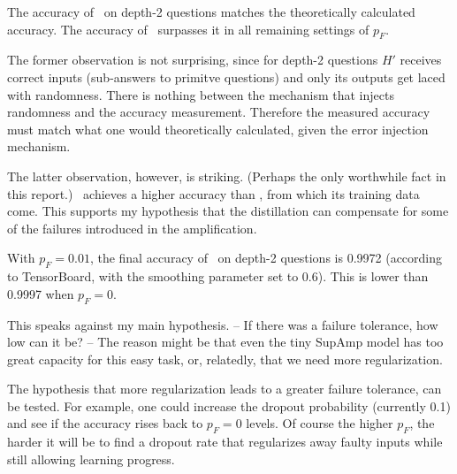 \documentclass{farlamp}
\begin{document}
\begin{LCRow}
\end{LCRow}

\Obs The accuracy of \AmpHp\ on depth-2 questions matches the theoretically
calculated accuracy. The accuracy of \Xpa\ surpasses it in all remaining settings
of $p_F$.

\Disc The former observation is not surprising, since for depth-2 questions $H'$
receives correct inputs (sub-answers to primitve questions) and only its outputs
get laced with randomness. There is nothing between the mechanism that injects
randomness and the accuracy measurement. Therefore the measured accuracy must
match what one would theoretically calculated, given the error injection
mechanism.

The latter observation, however, is striking. (Perhaps the only worthwhile fact
in this report.) \Xpa\ achieves a higher accuracy than \AmpHp, from which its
training data come. This supports my hypothesis that the distillation can
compensate for some of the failures introduced in the amplification.


\begin{LCRow}
\end{LCRow}

\Obs With $p_F = 0.01$, the final accuracy of \Xpa\ on depth-2 questions is
0.9972 (according to TensorBoard, with the smoothing parameter set to 0.6). This
is lower than 0.9997 when $p_F = 0$.

\Disc This speaks against my main hypothesis. – If there was a failure
tolerance, how low can it be? – The reason might be that even the tiny SupAmp
model has too great capacity for this easy task, or, relatedly, that we need
more regularization.

The hypothesis that more regularization leads to a greater failure tolerance,
can be tested. \TODO For example, one could increase the dropout probability
(currently 0.1) and see if the accuracy rises back to $p_F = 0$ levels. Of
course the higher $p_F$, the harder it will be to find a dropout rate that
regularizes away faulty inputs while still allowing learning progress.
\end{document}
